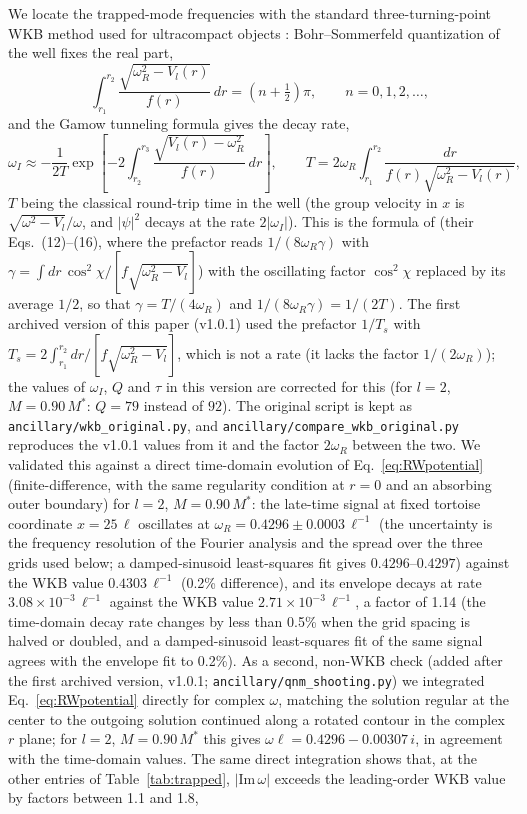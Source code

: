 \documentclass[11pt]{article}
\begin{document}
We locate the trapped-mode frequencies with the standard three-turning-point WKB method used for ultracompact objects \citep{CardosoLongLived2014}: Bohr--Sommerfeld quantization of the well fixes the real part,
\begin{equation}
\int_{r_1}^{r_2}\frac{\sqrt{\omega_R^2-V_l(r)}}{f(r)}\,dr=\left(n+\tfrac12\right)\pi,\qquad n=0,1,2,\dots,
\end{equation}
and the Gamow tunneling formula gives the decay rate,
\begin{equation}
\omega_I\approx-\frac{1}{2T}\exp\!\left[-2\int_{r_2}^{r_3}\frac{\sqrt{V_l(r)-\omega_R^2}}{f(r)}\,dr\right],\qquad T=2\omega_R\int_{r_1}^{r_2}\frac{dr}{f(r)\sqrt{\omega_R^2-V_l(r)}},
\end{equation}
$T$ being the classical round-trip time in the well (the group velocity in $x$ is $\sqrt{\omega^2-V_l}/\omega$, and $|\psi|^2$ decays at the rate $2|\omega_I|$). This is the formula of \citet{CardosoLongLived2014} (their Eqs.~(12)--(16), where the prefactor reads $1/(8\omega_R\gamma)$ with $\gamma=\int dr\,\cos^2\chi/[f\sqrt{\omega_R^2-V_l}]$) with the oscillating factor $\cos^2\chi$ replaced by its average $1/2$, so that $\gamma=T/(4\omega_R)$ and $1/(8\omega_R\gamma)=1/(2T)$. The first archived version of this paper (v1.0.1) used the prefactor $1/T_s$ with $T_s=2\int_{r_1}^{r_2}dr/[f\sqrt{\omega_R^2-V_l}]$, which is not a rate (it lacks the factor $1/(2\omega_R)$); the values of $\omega_I$, $Q$ and $\tau$ in this version are corrected for this (for $l=2$, $M=0.90\,M^*$: $Q=79$ instead of $92$). The original script is kept as \texttt{ancillary/wkb\_original.py}, and \texttt{ancillary/compare\_wkb\_original.py} reproduces the v1.0.1 values from it and the factor $2\omega_R$ between the two. We validated this against a direct time-domain evolution of Eq.~\eqref{eq:RWpotential} (finite-difference, with the same regularity condition at $r=0$ and an absorbing outer boundary) for $l=2$, $M=0.90\,M^*$: the late-time signal at fixed tortoise coordinate $x=25\,\ell$ oscillates at $\omega_R=0.4296\pm0.0003\,\ell^{-1}$ (the uncertainty is the frequency resolution of the Fourier analysis and the spread over the three grids used below; a damped-sinusoid least-squares fit gives $0.4296$--$0.4297$) against the WKB value $0.4303\,\ell^{-1}$ (0.2\% difference), and its envelope decays at rate $3.08\times10^{-3}\,\ell^{-1}$ against the WKB value $2.71\times10^{-3}\,\ell^{-1}$, a factor of 1.14 (the time-domain decay rate changes by less than 0.5\% when the grid spacing is halved or doubled, and a damped-sinusoid least-squares fit of the same signal agrees with the envelope fit to 0.2\%). As a second, non-WKB check (added after the first archived version, v1.0.1; \texttt{ancillary/qnm\_shooting.py}) we integrated Eq.~\eqref{eq:RWpotential} directly for complex $\omega$, matching the solution regular at the center to the outgoing solution continued along a rotated contour in the complex $r$ plane; for $l=2$, $M=0.90\,M^*$ this gives $\omega\ell=0.4296-0.00307\,i$, in agreement with the time-domain values. The same direct integration shows that, at the other entries of Table~\ref{tab:trapped}, $|\mathrm{Im}\,\omega|$ exceeds the leading-order WKB value by factors between 1.1 and 1.8, 
\end{document}
